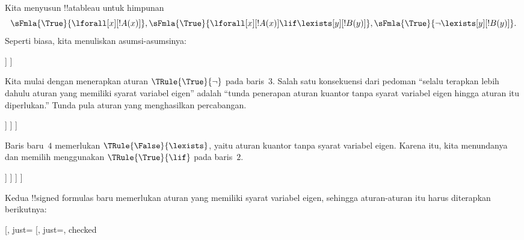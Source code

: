 \documentclass[../../../include/open-logic-section]{subfiles}
\begin{document}
\begin{ex}
Kita menyusun !!a{tableau} untuk himpunan
\[
\sFmla{\True}{\lforall[x][!A(x)]}, \sFmla{\True}{\lforall[x][!A(x)]
  \lif \lexists[y][!B(y)]}, \sFmla{\True}{\lnot\lexists[y][!B(y)]}.
\]
Seperti biasa, kita menuliskan asumsi-asumsinya:
\begin{oltableau}
  [\sFmla{\True}{\lforall[x][\formula{A}(x)]}, just=\TAss
    [\sFmla{\True}{\lforall[x][\formula{A}(x)] \lif
        \lexists[y][\formula{B}(y)]}, just=\TAss
      [\sFmla{\True}{\lnot\lexists[y][\formula{B}(y)]}, just=\TAss
      ]
    ]
  ]
\end{oltableau}
Kita mulai dengan menerapkan aturan $\TRule{\True}{\lnot}$ pada
baris~$3$. Salah satu konsekuensi dari pedoman ``selalu terapkan lebih
dahulu aturan yang memiliki syarat variabel eigen'' adalah ``tunda
penerapan aturan kuantor tanpa syarat variabel eigen hingga aturan itu
diperlukan.'' Tunda pula aturan yang menghasilkan percabangan.
\begin{oltableau}
  [\sFmla{\True}{\lforall[x][\formula{A}(x)]}, just=\TAss
    [\sFmla{\True}{\lforall[x][\formula{A}(x)] \lif
        \lexists[y][\formula{B}(y)]}, just=\TAss
      [\sFmla{\True}{\lnot\lexists[y][\formula{B}(y)]}, just=\TAss, checked
        [\sFmla{\False}{\lexists[y][\formula{B}(y)]}, just={\TRule{\True}{\lnot}[3]}]
      ]
    ]
  ]
\end{oltableau}
Baris baru~$4$ memerlukan $\TRule{\False}{\lexists}$, yaitu aturan
kuantor tanpa syarat variabel eigen. Karena itu, kita menundanya dan
memilih menggunakan $\TRule{\True}{\lif}$ pada baris~$2$.
\begin{oltableau}
  [\sFmla{\True}{\lforall[x][\formula{A}(x)]}, just=\TAss
    [\sFmla{\True}{\lforall[x][\formula{A}(x)] \lif
        \lexists[y][\formula{B}(y)]}, just=\TAss, checked
      [\sFmla{\True}{\lnot\lexists[y][\formula{B}(y)]}, just=\TAss, checked
        [\sFmla{\False}{\lexists[y][\formula{B}(y)]},
          just={\TRule{\True}{\lnot}[3]},
          [\sFmla{\False}{\lforall[x][\formula{A}(x)]}, just={\TRule{\True}{\lif}[2]}]
          [\sFmla{\True}{\lexists[y][\formula{B}(y)]}, just={\TRule{\True}{\lif}[2]}]
        ]
      ]
    ]
  ]
\end{oltableau}
Kedua !!{signed formula}s baru memerlukan aturan yang memiliki syarat
variabel eigen, sehingga aturan-aturan itu harus diterapkan berikutnya:
\begin{oltableau}
  [\sFmla{\True}{\lforall[x][\formula{A}(x)]}, just=\TAss
    [\sFmla{\True}{\lforall[x][\formula{A}(x)] \lif
        \lexists[y][\formula{B}(y)]}, just=\TAss, checked

\end{oltableau}
\end{ex}
\end{document}
